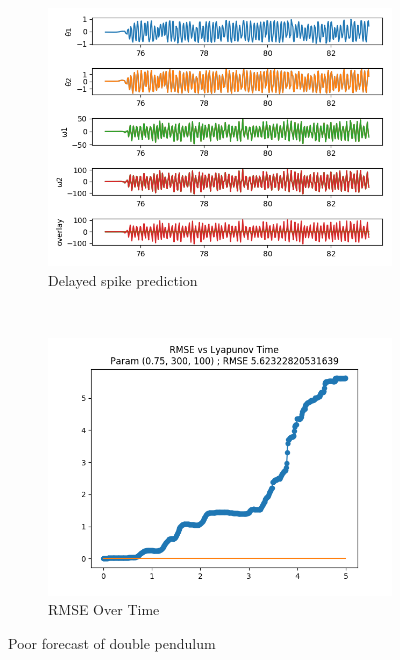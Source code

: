 \documentclass{article}
\begin{document}
\begin{figure}[H]
    \centering
    \begin{subfigure}[b]{0.45\textwidth}
        \includegraphics[width=\textwidth]{doc/paper/images/doub_pend/rank_3_param_52_fit.png}
        \caption{Delayed spike prediction}
    \end{subfigure}
    ~
    \begin{subfigure}[b]{0.45\textwidth}
        \includegraphics[width=\textwidth]{doc/paper/images/lorenz/rank_3_param_151_rmse.png}
        \caption{RMSE Over Time}
    \end{subfigure}
    \caption{Poor forecast of double pendulum}
\end{figure}
\end{document}
